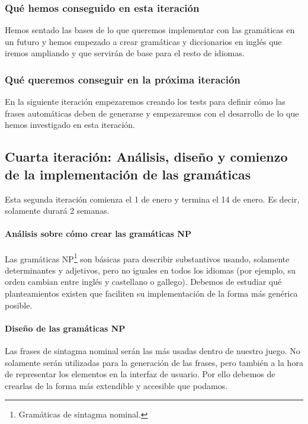 \subsubsection{Qué hemos conseguido en esta iteración}

Hemos sentado las bases de lo que queremos implementar con las gramáticas en un futuro y hemos empezado a crear gramáticas y diccionarios en inglés que iremos ampliando y que servirán de base para el resto de idiomas.

\subsubsection{Qué queremos conseguir en la próxima iteración}

En la siguiente iteración empezaremos creando los tests para definir cómo las frases automáticas deben de generarse y empezaremos con el desarrollo de lo que hemos investigado en esta iteración.

\subsection{Cuarta iteración: Análisis, diseño y comienzo de la implementación de las gramáticas}

Esta segunda iteración comienza el 1 de enero y termina el 14 de enero. Es decir, solamente durará 2 semanas.

\paragraph{Análisis sobre cómo crear las gramáticas NP} Las gramáticas NP\footnote{Gramáticas de sintagma nominal.} son básicas para describir substantivos usando, solamente determinantes y adjetivos, pero no iguales en todos los idiomas (por ejemplo, su orden cambian entre inglés y castellano o gallego). Debemos de estudiar qué planteamientos existen que faciliten su implementación de la forma más genérica posible.

\paragraph{Diseño de las gramáticas NP} Las frases de sintagma nominal serán las más usadas dentro de nuestro juego. No solamente serán utilizadas para la generación de las frases, pero también a la hora de representar los elementos en la interfaz de usuario. Por ello debemos de crearlas de la forma más extendible y accesible que podamos.

